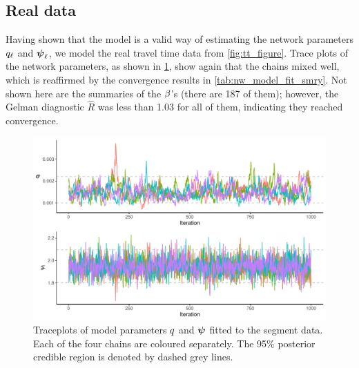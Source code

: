 \subsection{Real data}
\label{nw_par_est_real}



Having shown that the  model is a valid way of estimating the network parameters $q_\ell$ and $\mathbf{\boldsymbol{\psi}}_\ell$, we model the real travel time data from \cref{fig:tt_figure}. Trace plots of the network parameters, as shown in \cref{fig:nw_model_n1_view}, show again that the chains mixed well, which is reaffirmed by the convergence results in \cref{tab:nw_model_fit_smry}. Not shown here are the summaries of the $\beta$'s (there are 187 of them); however, the Gelman diagnostic $\hat R$ was less than 1.03 for all of them, indicating they reached convergence.

\begin{knitrout}\small
{}\color{fgcolor}\begin{figure}

{\centering \includegraphics[width=0.8\linewidth]{figure/nw_model_n1_view-1} 

}

\caption[Traceplots of model parameters fitted to the segment data]{Traceplots of model parameters $q$ and $\mathbf{\boldsymbol{\psi}}$ fitted to the segment data. Each of the four chains are coloured separately. The 95\% posterior credible region is denoted by dashed grey lines.}\label{fig:nw_model_n1_view}
\end{figure}


\end{knitrout}

